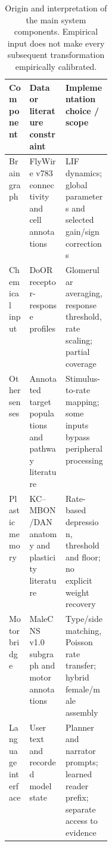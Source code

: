 \begin{table}[t]
\caption{Origin and interpretation of the main system components. Empirical input does not make every subsequent transformation empirically calibrated.}
\label{tab:provenance}
\small
\begin{tabularx}{\linewidth}{@{}p{0.20\linewidth}XX@{}}
\toprule
Component & Data or literature constraint & Implementation choice / scope \\
\midrule
Brain graph & FlyWire v783 connectivity and cell annotations & LIF dynamics; global parameters and selected gain/sign corrections \\
Chemical input & DoOR receptor-response profiles & Glomerular averaging, response threshold, rate scaling; partial coverage \\
Other senses & Annotated target populations and pathway literature & Stimulus-to-rate mapping; some inputs bypass peripheral processing \\
Plastic memory & KC--MBON/DAN anatomy and plasticity literature & Rate-based depression, threshold and floor; no explicit weight recovery \\
Motor bridge & MaleCNS v1.0 subgraph and motor annotations & Type/side matching, Poisson rate transfer; hybrid female/male assembly \\
Language interface & User text and recorded model state & Planner and narrator prompts; learned reader prefix; separate access to evidence \\
\bottomrule
\end{tabularx}
\end{table}
